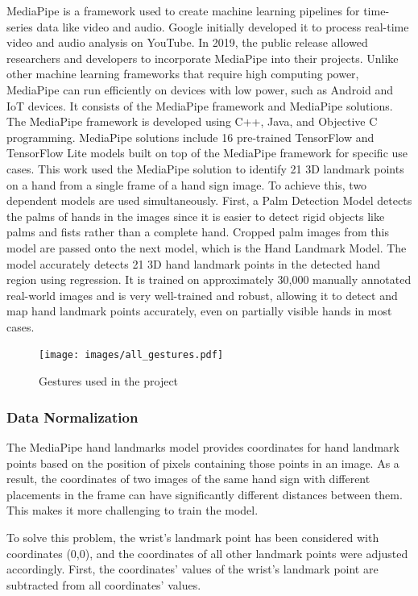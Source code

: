 MediaPipe is a framework used to create machine learning pipelines for time-series data like video and audio. Google initially developed it to process real-time video and audio analysis on YouTube. In 2019, the public release allowed researchers and developers to incorporate MediaPipe into their projects. Unlike other machine learning frameworks that require high computing power, MediaPipe can run efficiently on devices with low power, such as Android and IoT devices. It consists of the MediaPipe framework and MediaPipe solutions. The MediaPipe framework is developed using C++, Java, and Objective C programming. MediaPipe solutions include 16 pre-trained TensorFlow and TensorFlow Lite models built on top of the MediaPipe framework for specific use cases. This work used the MediaPipe solution to identify 21 3D landmark points on a hand from a single frame of a hand sign image. To achieve this, two dependent models are used simultaneously. First, a Palm Detection Model detects the palms of hands in the images since it is easier to detect rigid objects like palms and fists rather than a complete hand. Cropped palm images from this model are passed onto the next model, which is the Hand Landmark Model. The model accurately detects 21 3D hand landmark points in the detected hand region using regression. It is trained on approximately 30,000 manually annotated real-world images and is very well-trained and robust, allowing it to detect and map hand landmark points accurately, even on partially visible hands in most cases.


\begin{figure}
	\centering
	\texttt{[image: images/all\_gestures.pdf]}
	\caption{Gestures used in the project}
	\label{fig:all_gestures}
\end{figure}





\subsubsection{Data Normalization}
The MediaPipe hand landmarks model provides coordinates for hand landmark points based on the position of pixels containing those points in an image. As a result, the coordinates of two images of the same hand sign with different placements in the frame can have significantly different distances between them. This makes it more challenging to train the model.

 To solve this problem, the wrist's landmark point has been considered with coordinates (0,0), and the coordinates of all other landmark points were adjusted accordingly.
First, the coordinates' values of the wrist's landmark point are subtracted from all coordinates' values. 


